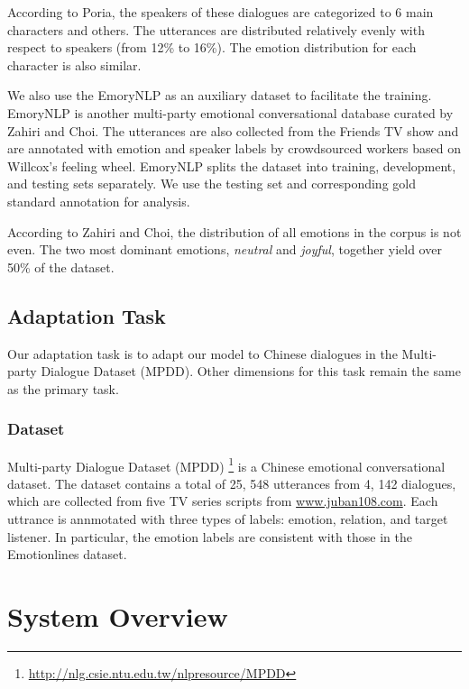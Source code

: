 \documentclass[11pt]{article}
\begin{document}
According to Poria, the speakers of these dialogues are categorized to 6 main characters and others. The utterances are distributed relatively evenly with respect to speakers (from 12\% to 16\%).  The emotion distribution for each character is also similar. 

We also use the EmoryNLP \citep{EmoryNLP} as an auxiliary dataset to facilitate the training. EmoryNLP is another multi-party emotional conversational database curated by Zahiri and Choi. The utterances are also collected from the Friends TV show and are annotated with emotion and speaker labels by crowdsourced workers based on Willcox's feeling wheel. EmoryNLP splits the dataset into training, development, and testing sets separately. We use the testing set and corresponding gold standard annotation for analysis. 

According to Zahiri and Choi, the distribution of all emotions in the corpus is not even. The two most dominant emotions, \textit{neutral} and \textit{joyful}, together yield over 50\% of the dataset.

\subsection{Adaptation Task}
\label{sect:adaptation_task}

Our adaptation task is to adapt our model to Chinese dialogues in the Multi-party Dialogue Dataset (MPDD). Other dimensions for this task remain the same as the primary task.

\subsubsection{Dataset}

Multi-party Dialogue Dataset (MPDD) \citep{chen-etal-2020-mpdd} \footnote{\url{http://nlg.csie.ntu.edu.tw/nlpresource/MPDD}} is a Chinese emotional conversational dataset. The dataset contains a total of 25, 548 utterances from 4, 142 dialogues, which are collected from five TV series scripts from \url{www.juban108.com}. Each uttrance is annmotated with three types of labels: emotion, relation, and target listener. In particular, the emotion labels are consistent with those in the Emotionlines dataset.


\section{System Overview}
\label{sec:overview}
\end{document}
